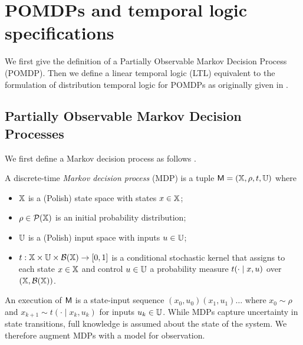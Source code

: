 \documentclass{ifacconf}
\newcommand{\cristi}[1]{{\color{orange}#1}}
\begin{document}
\section{POMDPs and temporal logic specifications}

We first give the definition of a Partially Observable Markov Decision Process (POMDP). Then we define a linear temporal logic (LTL) equivalent to the formulation of distribution temporal logic for POMDPs as originally given in \citep{JonesDTL2013}.

\subsection{Partially Observable Markov  Decision Processes}

We first define a Markov decision process as follows \citep{hll1996}.
\begin{definition}
\label{def:MDP}
  A discrete-time \emph{Markov decision process} (MDP) is a tuple $\mathsf{M} = ({\mathbb{X}}, \rho, t, {\mathbb{U}})$ where
  \begin{itemize}
    \item ${\mathbb{X}}$ is a (Polish) state space with states $x\in{\mathbb{X}}$; %
    \item $\rho \in \mathcal P({\mathbb{X}})$ is an initial probability distribution;
    \item ${\mathbb{U}}$ is a (Polish) input space with inputs $u\in{\mathbb{U}}$;
    \item $t:{\mathbb{X}}\times{\mathbb{U}}\times\mathcal B({\mathbb{X}})\rightarrow[0,1]$ is a conditional stochastic kernel that assigns to each state $x\in {\mathbb{X}}$ and control $u\in {\mathbb{U}}$ a probability measure $t(\cdot\mid x,u)$ over $({\mathbb{X}},\mathcal B({\mathbb{X}}))$.
  \end{itemize}
\end{definition}

An execution of $\mathsf{M}$ is a state-input sequence $(x_0, u_0)(x_1, u_1)\ldots$ where $x_0 \sim \rho$ and $x_{k+1} \sim t(\cdot \mid x_k, u_k)$ for inputs $u_k \in {\mathbb{U}}$. While MDPs capture uncertainty in state transitions, full knowledge is assumed about the state of the system. We therefore augment MDPs with a model for observation.

\end{document}
